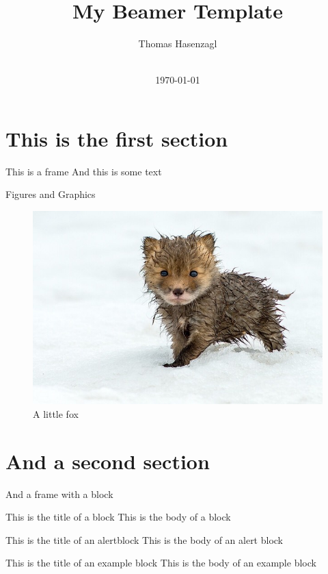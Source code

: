 \documentclass[xcolor=svgnames, 10pt]{beamer}
\begin{document}
{ 

\begin{frame}
    \title{\LARGE{My Beamer Template}}
    \author{Thomas Hasenzagl}
\date{
	\\
	\vspace{1cm}
	\today
    }
\titlepage    
\end{frame}}


\section{This is the first section} 


\begin{frame}{This is a frame}
    And this is some text
\end{frame}


\begin{frame}{Figures and Graphics}
    \begin{figure}
        \centering
        \includegraphics[scale=0.3]{fox}
        \caption{A little fox}
    \end{figure}
\end{frame}


\section{And a second section}


\begin{frame}{And a frame with a block}
    \begin{block}{This is the title of a block}
    This is the body of a block 
    \end{block}

    \begin{alertblock}{This is the title of an alertblock}
    This is the body of an alert block 
    \end{alertblock}

    \begin{exampleblock}{This is the title of an example block}
    This is the body of an example block 
    \end{exampleblock}

\end{frame}
\end{document}
